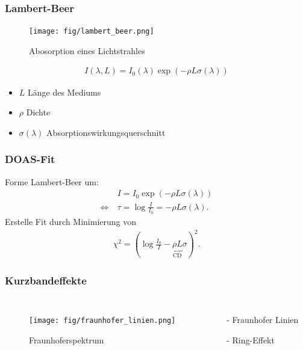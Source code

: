 \documentclass{beamer}
\begin{document}
\begin{frame}
    \frametitle{Lambert-Beer}
    \begin{figure}[h]
        \texttt{[image: fig/lambert\_beer.png]}
        \caption{Abosorption eines Lichtstrahles}
    \end{figure}
    \begin{align}
    	I(\lambda, L) = I_0 (\lambda) \exp (- \rho  L \sigma (\lambda) )
    \end{align}
    \begin{itemize}
        \item $L$ Länge des Mediums
        \item $\rho$ Dichte
        \item $\sigma (\lambda)$ Absorptionswirkungsquerschnitt %
    \end{itemize}
\end{frame}


\begin{frame}
    \frametitle{DOAS-Fit}
    Forme Lambert-Beer um:
	\begin{align}
        & I = I_0 \exp (-\rho L \sigma (\lambda)) \\
        \Leftrightarrow \ &\tau = \log \frac{I}{I_0} = - \rho L \sigma (\lambda).
	\end{align}
    \pause
	Erstelle Fit durch Minimierung von
    \begin{align}
        \chi^2 = ( \log \frac{I_0}{I} -\underbrace{\rho L}_{\text{CD}} \sigma )^2. 
    \end{align}
\end{frame}


\begin{frame}
    \frametitle{Kurzbandeffekte}
    \begin{columns}
    \begin{figure}
        \texttt{[image: fig/fraunhofer\_linien.png]}
        \caption{Fraunhoferspektrum}
    \end{figure}
        \begin{itemize}
            \item[-]{Fraunhofer Linien}
                \pause
            \item[-]{Ring-Effekt}
        \end{itemize}
    \end{columns}
\end{frame}
\end{document}
